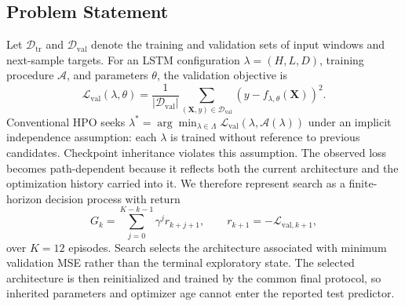 \documentclass[conference]{IEEEtran}
\begin{document}
\subsection{Problem Statement}
Let $\mathcal{D}_{\mathrm{tr}}$ and $\mathcal{D}_{\mathrm{val}}$ denote the training and validation sets of input windows and next-sample targets. For an LSTM configuration $\lambda=(H,L,D)$, training procedure $\mathcal{A}$, and parameters $\theta$, the validation objective is
\begin{equation}
  \mathcal{L}_{\mathrm{val}}(\lambda,\theta)
  =\frac{1}{|\mathcal{D}_{\mathrm{val}}|}
  \sum_{(\mathbf{X},y)\in\mathcal{D}_{\mathrm{val}}}
  \left(y-f_{\lambda,\theta}(\mathbf{X})\right)^2.
  \label{eq:objective}
\end{equation}
Conventional HPO seeks $\lambda^*=\arg\min_{\lambda\in\Lambda}\mathcal{L}_{\mathrm{val}}(\lambda,\mathcal{A}(\lambda))$ under an implicit independence assumption: each $\lambda$ is trained without reference to previous candidates. Checkpoint inheritance violates this assumption. The observed loss becomes path-dependent because it reflects both the current architecture and the optimization history carried into it. We therefore represent search as a finite-horizon decision process with return
\begin{equation}
   G_k=\sum_{j=0}^{K-k-1}\gamma^j r_{k+j+1},
   \qquad r_{k+1}=-\mathcal{L}_{\mathrm{val},k+1},
   \label{eq:return}
\end{equation}
over $K=12$ episodes. Search selects the architecture associated with minimum validation MSE rather than the terminal exploratory state. The selected architecture is then reinitialized and trained by the common final protocol, so inherited parameters and optimizer age cannot enter the reported test predictor.
\end{document}
